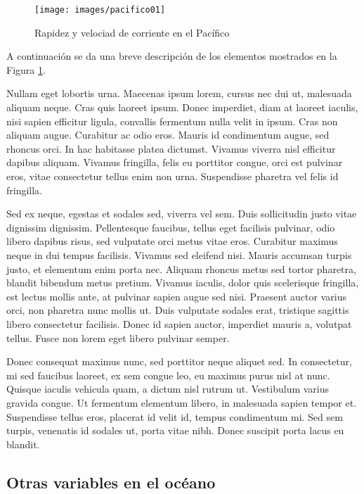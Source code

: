 \documentclass[
]{article}
\begin{document}
\begin{figure}
\texttt{[image: images/pacifico01]} \caption{Rapidez y velociad de corriente en el Pacífico}\label{fig:Mapa01}
\end{figure}

A continuación se da una breve descripción de los elementos mostrados en la Figura \ref{fig:Mapa01}.

Nullam eget lobortis urna. Maecenas ipsum lorem, cursus nec dui ut, malesuada aliquam neque. Cras quis laoreet ipsum. Donec imperdiet, diam at laoreet iaculis, nisi sapien efficitur ligula, convallis fermentum nulla velit in ipsum. Cras non aliquam augue. Curabitur ac odio eros. Mauris id condimentum augue, sed rhoncus orci. In hac habitasse platea dictumst. Vivamus viverra nisl efficitur dapibus aliquam. Vivamus fringilla, felis eu porttitor congue, orci est pulvinar eros, vitae consectetur tellus enim non urna. Suspendisse pharetra vel felis id fringilla.

Sed ex neque, egestas et sodales sed, viverra vel sem. Duis sollicitudin justo vitae dignissim dignissim. Pellentesque faucibus, tellus eget facilisis pulvinar, odio libero dapibus risus, sed vulputate orci metus vitae eros. Curabitur maximus neque in dui tempus facilisis. Vivamus sed eleifend nisi. Mauris accumsan turpis justo, et elementum enim porta nec. Aliquam rhoncus metus sed tortor pharetra, blandit bibendum metus pretium. Vivamus iaculis, dolor quis scelerisque fringilla, est lectus mollis ante, at pulvinar sapien augue sed nisi. Praesent auctor varius orci, non pharetra nunc mollis ut. Duis vulputate sodales erat, tristique sagittis libero consectetur facilisis. Donec id sapien auctor, imperdiet mauris a, volutpat tellus. Fusce non lorem eget libero pulvinar semper.

Donec consequat maximus nunc, sed porttitor neque aliquet sed. In consectetur, mi sed faucibus laoreet, ex sem congue leo, eu maximus purus nisl at nunc. Quisque iaculis vehicula quam, a dictum nisl rutrum ut. Vestibulum varius gravida congue. Ut fermentum elementum libero, in malesuada sapien tempor et. Suspendisse tellus eros, placerat id velit id, tempus condimentum mi. Sed sem turpis, venenatis id sodales ut, porta vitae nibh. Donec suscipit porta lacus eu blandit.

\hypertarget{otras-variables-en-el-ocuxe9ano}{%
\subsection{Otras variables en el océano}\label{otras-variables-en-el-ocuxe9ano}}
\end{document}
